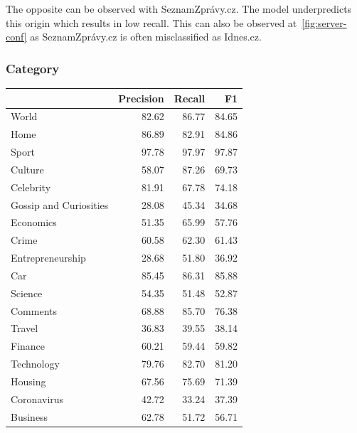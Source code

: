 The opposite can be observed with
SeznamZprávy.cz. The model underpredicts this origin which results in low
recall. This can also be observed at~\autoref{fig:server-conf} as SeznamZprávy.cz is
often misclassified as Idnes.cz.

\subsubsection{Category}
\label{sec:final-model-performance-on-category}
\begin{table}[H]
    \centering\footnotesize\sf
    \begin{tabular}{lrrr}
        \toprule
        {}                     & Precision & Recall & F1    \\
        \midrule
        World                  & 82.62     & 86.77  & 84.65 \\
        Home                   & 86.89     & 82.91  & 84.86 \\
        Sport                  & 97.78     & 97.97  & 97.87 \\
        Culture                & 58.07     & 87.26  & 69.73 \\
        Celebrity              & 81.91     & 67.78  & 74.18 \\
        Gossip and Curiosities & 28.08     & 45.34  & 34.68 \\
        Economics              & 51.35     & 65.99  & 57.76 \\
        Crime                  & 60.58     & 62.30  & 61.43 \\
        Entrepreneurship       & 28.68     & 51.80  & 36.92 \\
        Car                    & 85.45     & 86.31  & 85.88 \\
        Science                & 54.35     & 51.48  & 52.87 \\
        Comments               & 68.88     & 85.70  & 76.38 \\
        Travel                 & 36.83     & 39.55  & 38.14 \\
        Finance                & 60.21     & 59.44  & 59.82 \\
        Technology             & 79.76     & 82.70  & 81.20 \\
        Housing                & 67.56     & 75.69  & 71.39 \\
        Coronavirus            & 42.72     & 33.24  & 37.39 \\
        Business               & 62.78     & 51.72  & 56.71 \\

\end{tabular}
\end{table}
